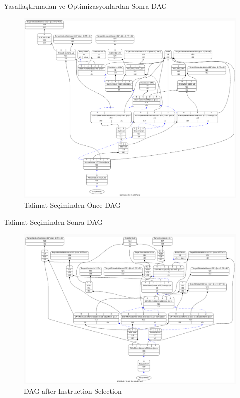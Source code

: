 \begin{frame}{Yasallaştırmadan ve Optimizasyonlardan Sonra DAG}
    \begin{figure}
    \centering
    \includegraphics[height=0.75\textheight]{path_instruction/madd_dag_isel.png}
    \caption{Talimat Seçiminden Önce DAG}
    \label{fig:isel}
\end{figure}
\end{frame}

\begin{frame}{Talimat Seçiminden Sonra DAG}
    \begin{figure}
    \centering
    \includegraphics[height=0.75\textheight]{path_instruction/madd_dag_sched.png}
    \caption{DAG after Instruction Selection}
    \label{fig:dag_sched}
\end{figure}
\end{frame}


